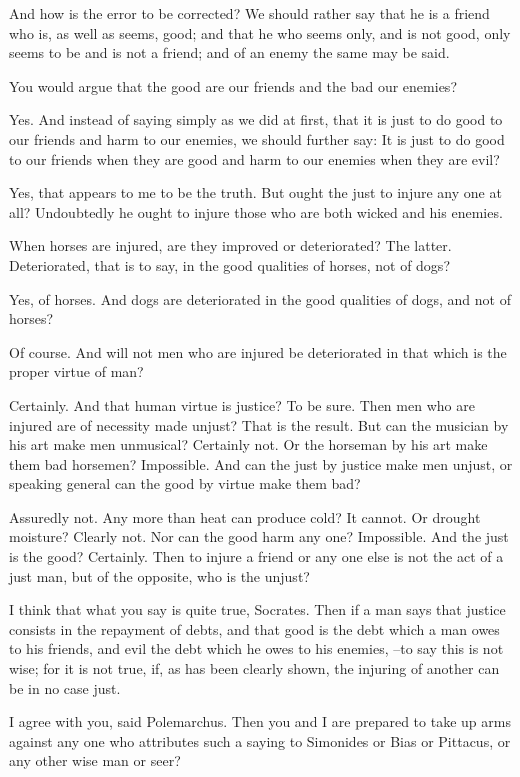 And how is the error to be corrected?
We should rather say that he is a friend who is, as well as seems, good; and that he who seems only, and is not good, only seems to be and is not a friend; and of an enemy the same may be said.

You would argue that the good are our friends and the bad our enemies?

Yes.
And instead of saying simply as we did at first, that it is just to do good to our friends and harm to our enemies, we should further say: It is just to do good to our friends when they are good and harm to our enemies when they are evil?

Yes, that appears to me to be the truth.
But ought the just to injure any one at all?
Undoubtedly he ought to injure those who are both wicked and his enemies.

When horses are injured, are they improved or deteriorated?
The latter.
Deteriorated, that is to say, in the good qualities of horses, not of dogs?

Yes, of horses.
And dogs are deteriorated in the good qualities of dogs, and not of horses?

Of course.
And will not men who are injured be deteriorated in that which is the proper virtue of man?

Certainly.
And that human virtue is justice?
To be sure.
Then men who are injured are of necessity made unjust?
That is the result.
But can the musician by his art make men unmusical?
Certainly not.
Or the horseman by his art make them bad horsemen?
Impossible.
And can the just by justice make men unjust, or speaking general can the good by virtue make them bad?

Assuredly not.
Any more than heat can produce cold?
It cannot.
Or drought moisture?
Clearly not.
Nor can the good harm any one?
Impossible.
And the just is the good?
Certainly.
Then to injure a friend or any one else is not the act of a just man, but of the opposite, who is the unjust?

I think that what you say is quite true, Socrates.
Then if a man says that justice consists in the repayment of debts, and that good is the debt which a man owes to his friends, and evil the debt which he owes to his enemies, --to say this is not wise; for it is not true, if, as has been clearly shown, the injuring of another can be in no case just.

I agree with you, said Polemarchus.
Then you and I are prepared to take up arms against any one who attributes such a saying to Simonides or Bias or Pittacus, or any other wise man or seer?

